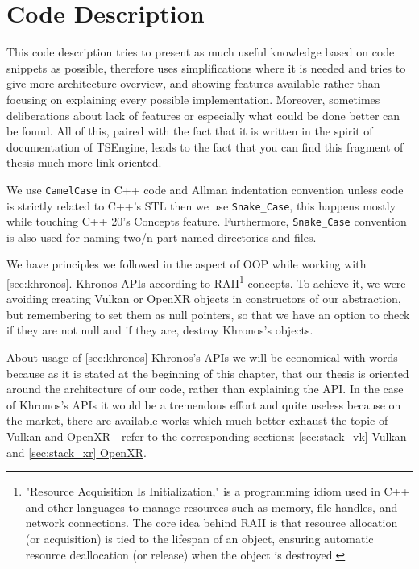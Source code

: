 \newpage
\section{Code Description}
\label{sec:code_descr}
\hspace{\parindent}
This code description tries to present as much useful knowledge based on code snippets as possible, therefore uses simplifications where it is needed and tries to give more architecture overview, and showing features available rather than focusing on explaining every possible implementation. Moreover, sometimes deliberations about lack of features or especially what could be done better can be found. All of this, paired with the fact that it is written in the spirit of documentation of TSEngine, leads to the fact that you can find this fragment of thesis much more link oriented.

We use \texttt{CamelCase} in C++ code and Allman indentation convention unless code is strictly related to C++'s STL then we use \texttt{Snake\_Case}, this happens mostly while touching C++ 20's Concepts feature.
Furthermore, \texttt{Snake\_Case} convention is also used for naming two/n-part named directories and files.

We have principles we followed in the aspect of OOP while working with \hyperref[sec:khronos]{\ref*{sec:khronos}. Khronos APIs} according to RAII\footnote{"Resource Acquisition Is Initialization," is a programming idiom used in C++ and other languages to manage resources such as memory, file handles, and network connections. The core idea behind RAII is that resource allocation (or acquisition) is tied to the lifespan of an object, ensuring automatic resource deallocation (or release) when the object is destroyed.} concepts. To achieve it, we were avoiding creating Vulkan or OpenXR objects in constructors of our abstraction, but remembering to set them as null pointers, so that we have an option to check if they are not null and if they are, destroy Khronos's objects.

About usage of \hyperref[sec:khronos]{\ref*{sec:khronos} Khronos's APIs} we will be economical with words because as it is stated at the beginning of this chapter, that our thesis is oriented around the architecture of our code, rather than explaining the API. In the case of Khronos's APIs it would be a tremendous effort and quite useless because on the market, there are available works which much better exhaust the topic of Vulkan and OpenXR - refer to the corresponding sections: \hyperref[sec:stack_vk]{\ref*{sec:stack_vk} Vulkan} and \hyperref[sec:stack_xr]{\ref*{sec:stack_xr} OpenXR}.

